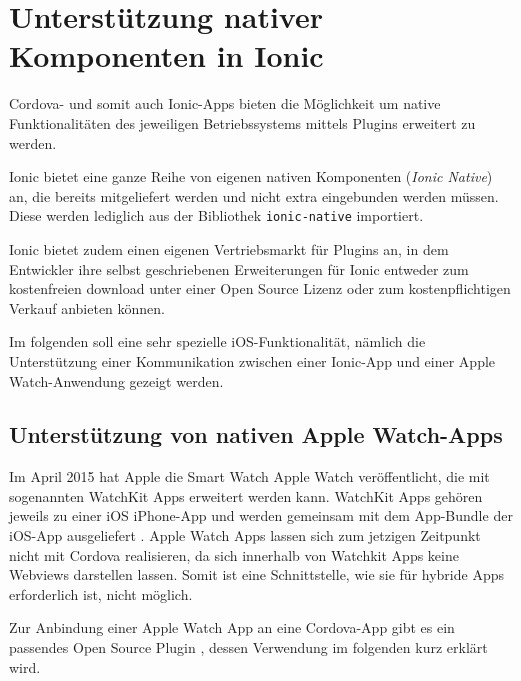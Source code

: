 \chapter{Unterstützung nativer Komponenten in Ionic}
%
Cordova- und somit auch Ionic-Apps bieten die Möglichkeit um native Funktionalitäten des jeweiligen Betriebssystems mittels Plugins erweitert zu werden.

Ionic bietet eine ganze Reihe von eigenen nativen Komponenten (\emph{Ionic Native}) an, die bereits mitgeliefert werden und nicht extra eingebunden werden müssen. Diese werden lediglich aus der Bibliothek \texttt{ionic-native} importiert.

Ionic bietet zudem einen eigenen Vertriebsmarkt für Plugins an, in dem Entwickler ihre selbst geschriebenen Erweiterungen für Ionic entweder zum kostenfreien download unter einer Open Source Lizenz oder zum kostenpflichtigen Verkauf anbieten können. 

Im folgenden soll eine sehr spezielle iOS-Funktionalität, nämlich die Unterstützung einer Kommunikation zwischen einer Ionic-App und einer Apple Watch-Anwendung gezeigt werden.
%
\section{Unterstützung von nativen Apple Watch-Apps}
%
Im April 2015 hat Apple die Smart Watch Apple Watch veröffentlicht, die mit sogenannten WatchKit Apps erweitert werden kann. WatchKit Apps gehören jeweils zu einer iOS iPhone-App und werden gemeinsam mit dem App-Bundle der iOS-App ausgeliefert \cite{appleAppleWatchProgrammingGuide}. Apple Watch Apps lassen sich zum jetzigen Zeitpunkt nicht mit Cordova realisieren, da sich innerhalb von Watchkit Apps keine Webviews darstellen lassen. Somit ist eine Schnittstelle, wie sie für hybride Apps erforderlich ist, nicht möglich.

Zur Anbindung einer Apple Watch App an eine Cordova-App gibt es ein passendes Open Source Plugin \cite{CrossleyCordovaAppleWatchPlugin}, dessen Verwendung im folgenden kurz erklärt wird.

